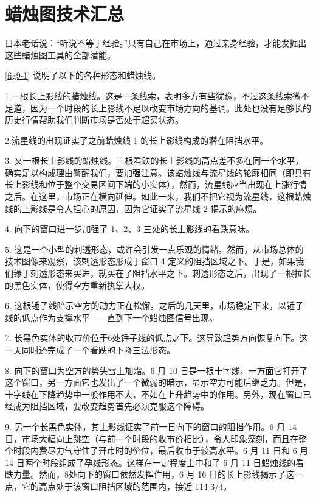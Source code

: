 \chapter{蜡烛图技术汇总\label{ch09}}
日本老话说：“听说不等于经验。”只有自己在市场上，通过亲身经验，才能发掘出这些蜡烛图工具的全部潜能。

\autoref{fig9-1} 说明了以下的各种形态和蜡烛线。

1.一根长上影线的蜡烛线。这是一条线索，表明多方有些犹豫，不过这条线索微不足道，因为一个时段的长上影线不足以改变市场方向的基调。此处也没有足够长的历史行情帮助我们判断市场是否处于超买状态。

2.流星线的出现证实了之前蜡烛线 1 的长上影线构成的潜在阻挡水平。

3. 又一根长上影线的蜡烛线。三根看跌的长上影线的高点差不多在同一个水平，确实足以构成理由警醒我们，要加强注意。该蜡烛线与流星线的轮廓相同（即具有长上影线和位于整个交易区间下端的小实体），然而，流星线应当出现在上涨行情之后。在这里，市场正在横向延伸。如此一来，我们不把它视为流星线，这根蜡烛线的上影线是令人担心的原因，因为它证实了流星线 2 揭示的麻烦。

4. 向下的窗口进一步加强了 1、2、3 三处的长上影线的看跌意味。

5. 这是一个小型的刺透形态，或许会引发一点乐观的情绪。然而，从市场总体的技术图像来观察，该刺透形态形成于窗口 4 定义的阻挡区域之下。于是，如果我们缘于刺透形态来买进，就买在了阻挡水平之下。刺透形态之后，出现了一根拉长的黑色实体，使得空方重新执掌大权。

6. 这根锤子线暗示空方的动力正在松懈。之后的几天里，市场稳定下来，以锤子线的低点作为支撑水平——直到下一个蜡烛图信号出现。

7. 长黑色实体的收市价位于6处锤子线的低点之下。这导致趋势方向恢复向下。这一天同时还完成了一个看跌的下降三法形态。

8. 向下的窗口为空方的势头雪上加霜。6 月 10 日是一根十字线，一方面它打开了这个窗口，另一方面它也发出了一个微弱的暗示，显示空方可能后继乏力。但是，十字线在下降趋势中一般作用不大，不如在上升趋势中的作用。另外，现在窗口已经成为阻挡区域，要改变趋势首先必须克服这个障碍。

9. 另一个长黑色实体，其上影线证实了前一日向下的窗口的阻挡作用。6 月 14 日，市场大幅向上跳空（与前一个时段的收市价相比），令人印象深刻，而且在整个时段内费尽力气守住了开市时的价位，最后收市于较高水平。6 月 11 日和 6 月 14 日两个时段组成了孕线形态。这样在一定程度上中和了 6 月 11 日蜡烛线的看跌力量。然而，8处向下的窗口依然发挥作用，6 月 16 日的长上影线揭示了这一点，它的高点处于该窗口阻挡区域的范围内，接近 114 3/4。

